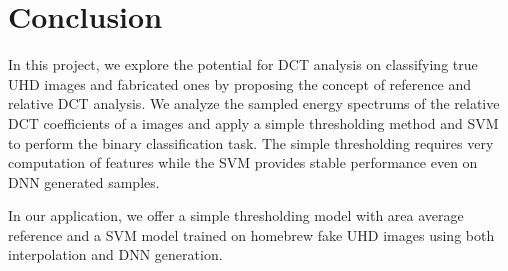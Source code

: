 \documentclass[journal,conference]{IEEEtran}
\begin{document}
\section{Conclusion}
In this project, we explore the potential for DCT analysis on classifying true UHD images and fabricated ones by proposing the concept of reference and relative DCT analysis.
We analyze the sampled energy spectrums of the relative DCT coefficients of a images and apply a simple thresholding method and SVM to perform the binary classification task.
The simple thresholding requires very computation of features while the SVM provides stable performance even on DNN generated samples.

In our application, we offer a simple thresholding model with area average reference and a SVM model trained on homebrew fake UHD images using both interpolation and DNN generation.







\end{document}
